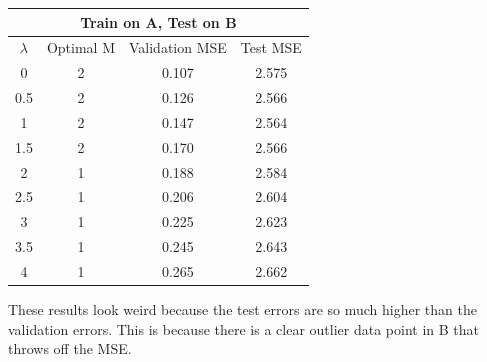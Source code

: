 \documentclass{article}
\begin{document}
\begin{center}
 \begin{tabular}{||c c c c||} 
 \hline
 \multicolumn{4}{|c|}{Train on A, Test on B} \\
 \hline
 \hline
 $\lambda$ & Optimal M & Validation MSE & Test MSE\\ [0.5ex] 
 \hline\hline
 0 & 2 & 0.107 & 2.575 \\ 
 \hline
 0.5 & 2 & 0.126 & 2.566 \\
 \hline
 1 & 2 & 0.147 & 2.564 \\
 \hline
 1.5 & 2 & 0.170 & 2.566 \\
 \hline
2 & 1 & 0.188 & 2.584 \\
 \hline
2.5 & 1 & 0.206 & 2.604 \\
 \hline
3 & 1 & 0.225 & 2.623 \\
 \hline
 3.5 & 1 & 0.245 & 2.643 \\
 \hline
4 & 1 & 0.265 & 2.662 \\
 \hline
\end{tabular}
\end{center}

These results look weird because the test errors are so much higher than the validation errors. This is because there is a clear outlier data point in B that throws off the MSE.
\end{document}
